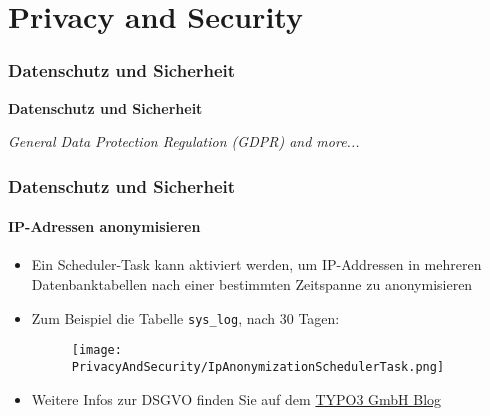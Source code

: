%

\section{Privacy and Security}
\begin{frame}[fragile]
	\frametitle{Datenschutz und Sicherheit}

	\begin{center}\huge{\color{typo3darkgrey}\textbf{Datenschutz und Sicherheit}}\end{center}
	\begin{center}\large{\textit{General Data Protection Regulation (GDPR) and more...}}\end{center}

\end{frame}


\begin{frame}[fragile]
	\frametitle{Datenschutz und Sicherheit}
	\framesubtitle{IP-Adressen anonymisieren}

	\begin{itemize}
		\item Ein Scheduler-Task kann aktiviert werden, um IP-Addressen in mehreren Datenbanktabellen
			nach einer bestimmten Zeitspanne zu anonymisieren
		\item Zum Beispiel die Tabelle \texttt{sys\_log}, nach 30 Tagen:
			\begin{figure}
				\texttt{[image: PrivacyAndSecurity/IpAnonymizationSchedulerTask.png]}
			\end{figure}
		\item Weitere Infos zur DSGVO finden Sie auf dem \href{https://typo3.com/blog/tag/gdpr/}{TYPO3 GmbH Blog}
	\end{itemize}

\end{frame}


